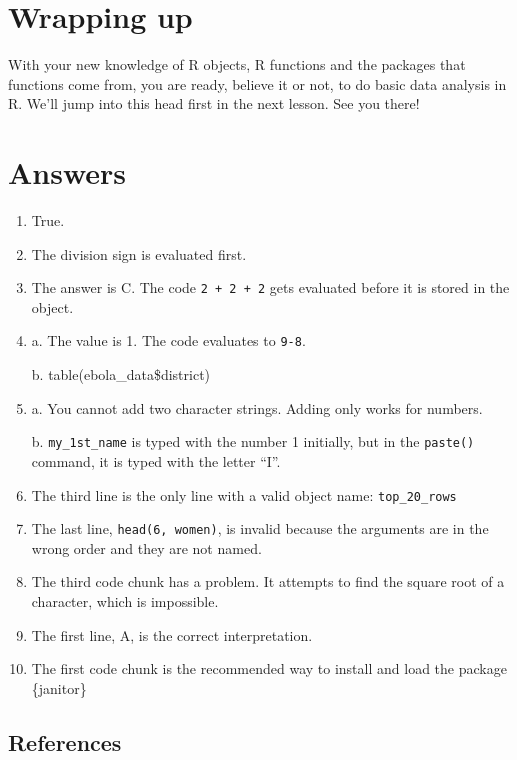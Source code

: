 \documentclass[
  letterpaper,
  DIV=11,
  numbers=noendperiod]{scrreprt}
\begin{document}
\hypertarget{wrapping-up-1}{%
\section{Wrapping up}\label{wrapping-up-1}}

With your new knowledge of R objects, R functions and the packages that
functions come from, you are ready, believe it or not, to do basic data
analysis in R. We'll jump into this head first in the next lesson. See
you there!

\hypertarget{answers}{%
\section{Answers}\label{answers}}

\begin{enumerate}
\def\labelenumi{\arabic{enumi}.}
\item
  True.
\item
  The division sign is evaluated first.
\item
  The answer is C. The code \texttt{2\ +\ 2\ +\ 2} gets evaluated before
  it is stored in the object.
\item
  a. The value is 1. The code evaluates to \texttt{9-8}.

  b. table(ebola\_data\$district)
\item
  a. You cannot add two character strings. Adding only works for
  numbers.

  b. \texttt{my\_1st\_name} is typed with the number 1 initially, but in
  the \texttt{paste()} command, it is typed with the letter ``I''.
\item
  The third line is the only line with a valid object name:
  \texttt{top\_20\_rows}
\item
  The last line, \texttt{head(6,\ women)}, is invalid because the
  arguments are in the wrong order and they are not named.
\item
  The third code chunk has a problem. It attempts to find the square
  root of a character, which is impossible.
\item
  The first line, A, is the correct interpretation.
\item
  The first code chunk is the recommended way to install and load the
  package \{janitor\}
\end{enumerate}

\hypertarget{references-3}{%
\subsection*{References}\label{references-3}}
\end{document}
